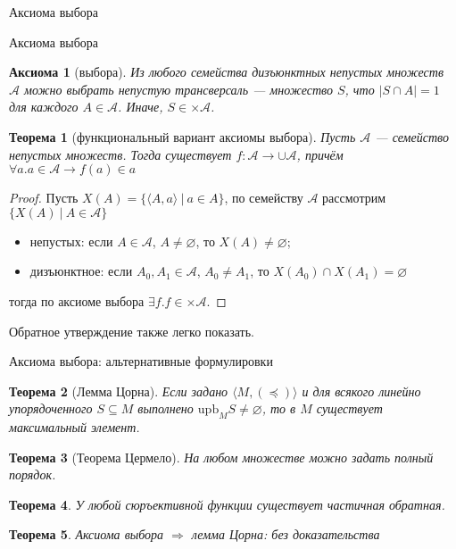 \documentclass[aspectratio=169]{beamer}
\newtheorem{axm}{Аксиома}[section]
\newtheorem{thm}{Теорема}[section]
\begin{document}
\begin{frame}
\begin{center}\LARGE Аксиома выбора\end{center}
\end{frame}

\begin{frame}{Аксиома выбора}
\begin{axm}[выбора]
Из любого семейства дизъюнктных непустых множеств $\mathcal{A}$ можно выбрать непустую трансверсаль --- 
множество $S$, что $|S \cap A| = 1$ для каждого $A\in\mathcal{A}$. Иначе, $S \in \times \mathcal{A}$.
\end{axm}

\begin{thm}[функциональный вариант аксиомы выбора]
Пусть $\mathcal{A}$ --- семейство непустых множеств. Тогда существует
$f : \mathcal{A} \rightarrow \cup \mathcal{A}$, причём $\forall a.a \in \mathcal{A} \rightarrow f(a) \in a$
\end{thm}

\begin{proof}
Пусть $X(A) = \{ \langle A, a \rangle \ |\ a \in A \}$, 
по семейству $\mathcal{A}$ рассмотрим $\{X(A)\ |\ A\in\mathcal{A}\}$
\begin{itemize}
\item непустых: если $A\in\mathcal{A}$, $A \ne \varnothing$, то $X(A) \ne \varnothing$;
\item дизъюнктное: если $A_0,A_1\in\mathcal{A}$, $A_0 \ne A_1$, то $X(A_0) \cap X(A_1) = \varnothing$
\end{itemize}
тогда по аксиоме выбора $\exists f.f \in \times \mathcal{A}$.
\end{proof}
Обратное утверждение также легко показать.
\end{frame}

\begin{frame}{Аксиома выбора: альтернативные формулировки}
\begin{thm}[Лемма Цорна]
Если задано $\langle M, (\preceq) \rangle$ и для всякого линейно упорядоченного $S \subseteq M$ выполнено
$\text{upb}_M S \ne \varnothing$, то в $M$ существует максимальный элемент.
\end{thm}
\begin{thm}[Теорема Цермело]
На любом множестве можно задать полный порядок.
\end{thm}
\begin{thm}
У любой сюръективной функции существует частичная обратная.
\end{thm}

\begin{thm}
Аксиома выбора $\Rightarrow$ лемма Цорна: без доказательства
\end{thm}
\end{frame}
\end{document}
